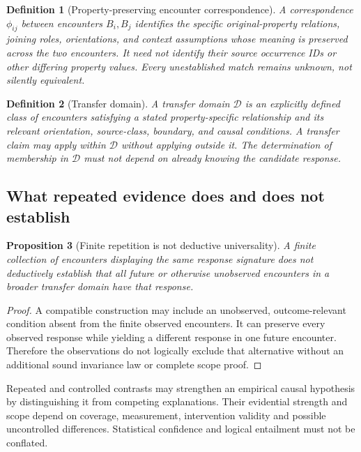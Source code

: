 \documentclass[11pt]{article}
\newtheorem{definition}{Definition}[section]
\newtheorem{proposition}[definition]{Proposition}
\begin{document}
\begin{definition}[Property-preserving encounter correspondence]
A correspondence $\phi_{ij}$ between encounters $B_i,B_j$
identifies the specific original-property \emph{relations},
joining roles, orientations, and context assumptions whose
meaning is preserved across the two encounters. It need
not identify their source occurrence IDs or other differing
property values. Every unestablished match remains unknown,
not silently equivalent.
\end{definition}

\begin{definition}[Transfer domain]
A transfer domain $\mathcal D$ is an explicitly defined
class of encounters satisfying a stated property-specific
relationship and its relevant orientation, source-class,
boundary, and causal conditions. A transfer claim may
apply within $\mathcal D$ without applying outside it.
The determination of membership in $\mathcal D$ must not
depend on already knowing the candidate response.
\end{definition}

\subsection{What repeated evidence does and does not establish}
\begin{proposition}[Finite repetition is not deductive universality]
A finite collection of encounters displaying the same
response signature does not deductively establish that
all future or otherwise unobserved encounters in a
broader transfer domain have that response.
\end{proposition}
\begin{proof}
A compatible construction may include an unobserved,
outcome-relevant condition absent from the finite
observed encounters. It can preserve every observed
response while yielding a different response in one
future encounter. Therefore the observations do not
logically exclude that alternative without an
additional sound invariance law or complete scope proof.
\end{proof}

Repeated and controlled contrasts may strengthen an empirical
causal hypothesis by distinguishing it from competing
explanations. Their evidential strength and scope depend
on coverage, measurement, intervention validity and
possible uncontrolled differences. Statistical confidence
and logical entailment must not be conflated.
\end{document}
